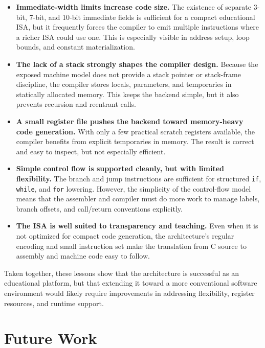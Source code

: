 \documentclass[12pt]{report}
\begin{document}
\begin{itemize}
    \item \textbf{Immediate-width limits increase code size.} The existence of
          separate 3-bit, 7-bit, and 10-bit immediate fields is sufficient for
          a compact educational ISA, but it frequently forces the compiler to
          emit multiple instructions where a richer ISA could use one. This is
          especially visible in address setup, loop bounds, and constant
          materialization.
    \item \textbf{The lack of a stack strongly shapes the compiler design.}
          Because the exposed machine model does not provide a stack pointer or
          stack-frame discipline, the compiler stores locals, parameters, and
          temporaries in statically allocated memory. This keeps the backend
          simple, but it also prevents recursion and reentrant calls.
    \item \textbf{A small register file pushes the backend toward memory-heavy
          code generation.} With only a few practical scratch registers
          available, the compiler benefits from explicit temporaries in memory.
          The result is correct and easy to inspect, but not especially
          efficient.
    \item \textbf{Simple control flow is supported cleanly, but with limited
          flexibility.} The branch and jump instructions are sufficient for
          structured \texttt{if}, \texttt{while}, and \texttt{for} lowering.
          However, the simplicity of the control-flow model means that the
          assembler and compiler must do more work to manage labels, branch
          offsets, and call/return conventions explicitly.
    \item \textbf{The ISA is well suited to transparency and teaching.} Even
          when it is not optimized for compact code generation, the
          architecture's regular encoding and small instruction set make the
          translation from C source to assembly and machine code easy to follow.
\end{itemize}

Taken together, these lessons show that the architecture is successful as an
educational platform, but that extending it toward a more conventional software
environment would likely require improvements in addressing flexibility,
register resources, and runtime support.

\section{Future Work}
\end{document}
